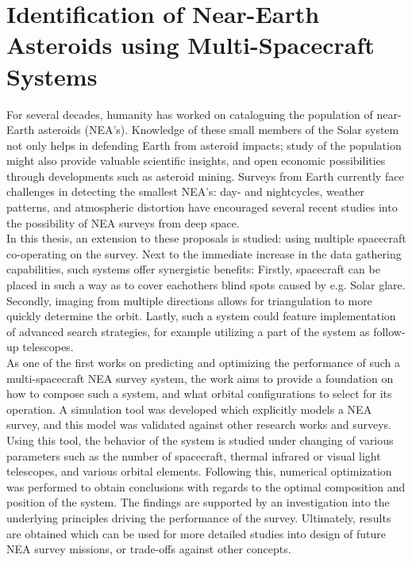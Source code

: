 \documentclass[whitelogo]{TUD-report2020}
\begin{document}
\chapter*{Identification of Near-Earth Asteroids using Multi-Spacecraft Systems}

For several decades, humanity has worked on cataloguing the population of near-Earth asteroids (NEA's). Knowledge of these small members of the Solar system not only helps in defending Earth from asteroid impacts; study of the population might also provide valuable scientific insights, and open economic possibilities through developments such as asteroid mining. Surveys from Earth currently face challenges in detecting the smallest NEA's: day- and nightcycles, weather patterns, and atmospheric distortion have encouraged several recent studies into the possibility of NEA surveys from deep space.\\

\noindent In this thesis, an extension to these proposals is studied: using multiple spacecraft co-operating on the survey. Next to the immediate increase in the data gathering capabilities, such systems offer synergistic benefits: Firstly, spacecraft can be placed in such a way as to cover eachothers blind spots caused by e.g. Solar glare. Secondly, imaging from multiple directions allows for triangulation to more quickly determine the orbit. Lastly, such a system could feature implementation of advanced search strategies, for example utilizing a part of the system as follow-up telescopes. \\

\noindent As one of the first works on predicting and optimizing the performance of such a multi-spacecraft NEA survey system, the work aims to provide a foundation on how to compose such a system, and what orbital configurations to select for its operation. A simulation tool was developed which explicitly models a NEA survey, and this model was validated against other research works and surveys. Using this tool, the behavior of the system is studied under changing of various parameters such as the number of spacecraft, thermal infrared or visual light telescopes, and various orbital elements. Following this, numerical optimization was performed to obtain conclusions with regards to the optimal composition and position of the system. The findings are supported by an investigation into the underlying principles driving the performance of the survey. Ultimately, results are obtained which can be used for more detailed studies into design of future NEA survey missions, or trade-offs against other concepts.
\end{document}
